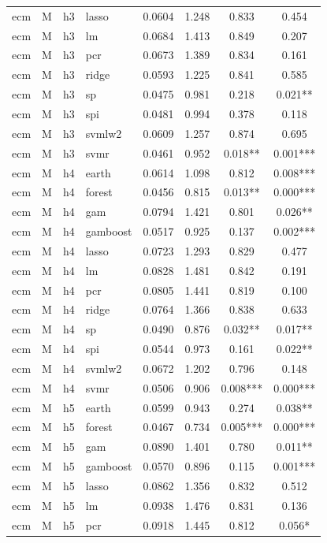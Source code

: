 \begin{ThreePartTable}
\begin{longtable}[t]{llclcccc}
ecm & M & h3 & lasso & 0.0604 & 1.248 & 0.833 & 0.454\\
ecm & M & h3 & lm & 0.0684 & 1.413 & 0.849 & 0.207\\
ecm & M & h3 & pcr & 0.0673 & 1.389 & 0.834 & 0.161\\
ecm & M & h3 & ridge & 0.0593 & 1.225 & 0.841 & 0.585\\
ecm & M & h3 & sp & 0.0475 & 0.981 & 0.218 & 0.021**\\
ecm & M & h3 & spi & 0.0481 & 0.994 & 0.378 & 0.118\\
ecm & M & h3 & svmlw2 & 0.0609 & 1.257 & 0.874 & 0.695\\
ecm & M & h3 & svmr & 0.0461 & 0.952 & 0.018** & 0.001***\\
\addlinespace
ecm & M & h4 & earth & 0.0614 & 1.098 & 0.812 & 0.008***\\
ecm & M & h4 & forest & 0.0456 & 0.815 & 0.013** & 0.000***\\
ecm & M & h4 & gam & 0.0794 & 1.421 & 0.801 & 0.026**\\
ecm & M & h4 & gamboost & 0.0517 & 0.925 & 0.137 & 0.002***\\
ecm & M & h4 & lasso & 0.0723 & 1.293 & 0.829 & 0.477\\
ecm & M & h4 & lm & 0.0828 & 1.481 & 0.842 & 0.191\\
ecm & M & h4 & pcr & 0.0805 & 1.441 & 0.819 & 0.100\\
ecm & M & h4 & ridge & 0.0764 & 1.366 & 0.838 & 0.633\\
ecm & M & h4 & sp & 0.0490 & 0.876 & 0.032** & 0.017**\\
ecm & M & h4 & spi & 0.0544 & 0.973 & 0.161 & 0.022**\\
ecm & M & h4 & svmlw2 & 0.0672 & 1.202 & 0.796 & 0.148\\
ecm & M & h4 & svmr & 0.0506 & 0.906 & 0.008*** & 0.000***\\
\addlinespace
ecm & M & h5 & earth & 0.0599 & 0.943 & 0.274 & 0.038**\\
ecm & M & h5 & forest & 0.0467 & 0.734 & 0.005*** & 0.000***\\
ecm & M & h5 & gam & 0.0890 & 1.401 & 0.780 & 0.011**\\
ecm & M & h5 & gamboost & 0.0570 & 0.896 & 0.115 & 0.001***\\
ecm & M & h5 & lasso & 0.0862 & 1.356 & 0.832 & 0.512\\
ecm & M & h5 & lm & 0.0938 & 1.476 & 0.831 & 0.136\\
ecm & M & h5 & pcr & 0.0918 & 1.445 & 0.812 & 0.056*\\

\end{longtable}
\end{ThreePartTable}
